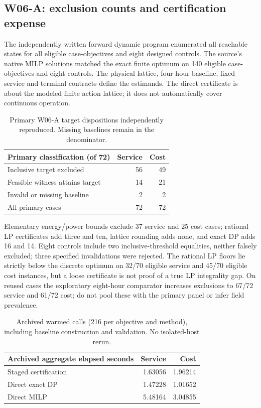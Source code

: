 \documentclass[11pt,letterpaper]{article}
\begin{document}
\subsection{W06-A: exclusion counts and certification expense}
The independently written forward dynamic program enumerated all reachable states for all eligible case-objectives and eight designed controls. The source's native MILP solutions matched the exact finite optimum on 140 eligible case-objectives and eight controls. The physical lattice, four-hour baseline, fixed service and terminal contracts define the estimands. The direct certificate is about the modeled finite action lattice; it does not automatically cover continuous operation.
\begin{table}[htbp]\centering\small
\begin{tabular}{lrr}\toprule
Primary classification (of 72) & Service & Cost\\\midrule
Inclusive target excluded &56&49\\
Feasible witness attains target &14&21\\
Invalid or missing baseline &2&2\\\midrule
All primary cases &72&72\\\bottomrule
\end{tabular}
\caption{Primary W06-A target dispositions independently reproduced. Missing baselines remain in the denominator.}
\end{table}
Elementary energy/power bounds exclude 37 service and 25 cost cases; rational LP certificates add three and ten, lattice rounding adds none, and exact DP adds 16 and 14. Eight controls include two inclusive-threshold equalities, neither falsely excluded; three specified invalidations were rejected. The rational LP floors lie strictly below the discrete optimum on 32/70 eligible service and 45/70 eligible cost instances, but a loose certificate is not proof of a true LP integrality gap. On reused cases the exploratory eight-hour comparator increases exclusions to 67/72 service and 61/72 cost; do not pool these with the primary panel or infer field prevalence.
\begin{table}[htbp]\centering\small
\begin{tabular}{lrr}\toprule
Archived aggregate elapsed seconds & Service & Cost\\\midrule
Staged certification &1.63056&1.96214\\
Direct exact DP &1.47228&1.01652\\
Direct MILP &5.48164&3.04855\\\bottomrule
\end{tabular}
\caption{Archived warmed calls (216 per objective and method), including baseline construction and validation. No isolated-host rerun.}
\end{table}
\end{document}
